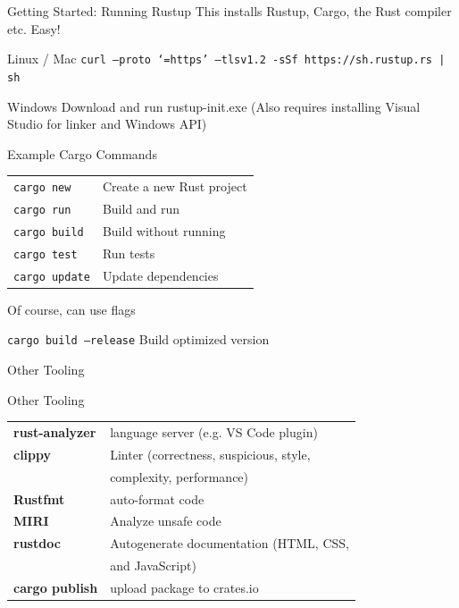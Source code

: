 \documentclass{beamer}
\begin{document}
\begin{frame}{Getting Started: Running Rustup} 
This installs Rustup, Cargo, the Rust compiler etc. Easy! 
\begin{block}{Linux / Mac}
\texttt{curl --proto `=https' --tlsv1.2 -sSf https://sh.rustup.rs | sh}
\end{block}
\begin{block}{Windows}
Download and run rustup-init.exe (Also requires installing Visual Studio for linker and Windows API)
\end{block}
\end{frame}

\begin{frame}{Example Cargo Commands} 
\begin{block}{}
\begin{tabular}{@{}l l@{}}
\texttt{cargo new}     & Create a new Rust project \\
\texttt{cargo run}     & Build and run \\
\texttt{cargo build}     & Build without running \\
\texttt{cargo test}    & Run tests \\
\texttt{cargo update}  & Update dependencies\\
\end{tabular}
\end{block}

Of course, can use flags 
\begin{block}{}
\texttt{cargo build --release} \hspace{3em} Build optimized version
\end{block}
\end{frame}

\begin{frame}{Other Tooling} 
\begin{block}{Other Tooling}
\begin{tabular}{@{}l l@{}}
\textbf{rust-analyzer}     &  language server (e.g. VS Code plugin) \\
\textbf{clippy}     &  Linter (correctness, suspicious, style, \\
					&			complexity, performance) \\
\textbf{Rustfmt}    & auto-format code \\
\textbf{MIRI}    	& Analyze unsafe code \\
\textbf{rustdoc}  & Autogenerate documentation (HTML, CSS, \\
					&			and JavaScript)\\
\textbf{cargo publish} & upload package to crates.io \\
\end{tabular}
\end{block}
\end{frame}
\end{document}
